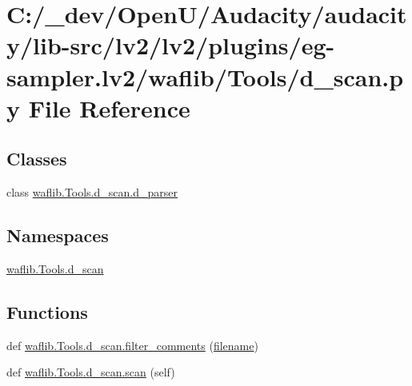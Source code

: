 \hypertarget{lv2_2plugins_2eg-sampler_8lv2_2waflib_2_tools_2d__scan_8py}{}\section{C\+:/\+\_\+dev/\+Open\+U/\+Audacity/audacity/lib-\/src/lv2/lv2/plugins/eg-\/sampler.lv2/waflib/\+Tools/d\+\_\+scan.py File Reference}
\label{lv2_2plugins_2eg-sampler_8lv2_2waflib_2_tools_2d__scan_8py}
\subsection*{Classes}
\begin{DoxyCompactItemize}
\item 
class \hyperlink{classwaflib_1_1_tools_1_1d__scan_1_1d__parser}{waflib.\+Tools.\+d\+\_\+scan.\+d\+\_\+parser}
\end{DoxyCompactItemize}
\subsection*{Namespaces}
\begin{DoxyCompactItemize}
\item 
 \hyperlink{namespacewaflib_1_1_tools_1_1d__scan}{waflib.\+Tools.\+d\+\_\+scan}
\end{DoxyCompactItemize}
\subsection*{Functions}
\begin{DoxyCompactItemize}
\item 
def \hyperlink{namespacewaflib_1_1_tools_1_1d__scan_a69a1f7647c38122c357199fd7b4444d3}{waflib.\+Tools.\+d\+\_\+scan.\+filter\+\_\+comments} (\hyperlink{test__portburn_8cpp_a7efa5e9c7494c7d4586359300221aa5d}{filename})
\item 
def \hyperlink{namespacewaflib_1_1_tools_1_1d__scan_ac5685815562961157b97476a3a3658ca}{waflib.\+Tools.\+d\+\_\+scan.\+scan} (self)
\end{DoxyCompactItemize}
